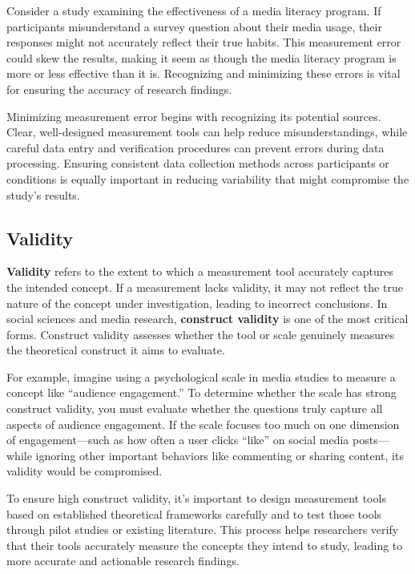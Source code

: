 \documentclass[
]{book}
\begin{document}
Consider a study examining the effectiveness of a media literacy program. If participants misunderstand a survey question about their media usage, their responses might not accurately reflect their true habits. This measurement error could skew the results, making it seem as though the media literacy program is more or less effective than it is. Recognizing and minimizing these errors is vital for ensuring the accuracy of research findings.

Minimizing measurement error begins with recognizing its potential sources. Clear, well-designed measurement tools can help reduce misunderstandings, while careful data entry and verification procedures can prevent errors during data processing. Ensuring consistent data collection methods across participants or conditions is equally important in reducing variability that might compromise the study's results.

\subsection*{Validity}\label{validity}

\textbf{Validity} refers to the extent to which a measurement tool accurately captures the intended concept. If a measurement lacks validity, it may not reflect the true nature of the concept under investigation, leading to incorrect conclusions. In social sciences and media research, \textbf{construct validity} is one of the most critical forms. Construct validity assesses whether the tool or scale genuinely measures the theoretical construct it aims to evaluate.

For example, imagine using a psychological scale in media studies to measure a concept like ``audience engagement.'' To determine whether the scale has strong construct validity, you must evaluate whether the questions truly capture all aspects of audience engagement. If the scale focuses too much on one dimension of engagement---such as how often a user clicks ``like'' on social media posts---while ignoring other important behaviors like commenting or sharing content, its validity would be compromised.

To ensure high construct validity, it's important to design measurement tools based on established theoretical frameworks carefully and to test those tools through pilot studies or existing literature. This process helps researchers verify that their tools accurately measure the concepts they intend to study, leading to more accurate and actionable research findings.
\end{document}
